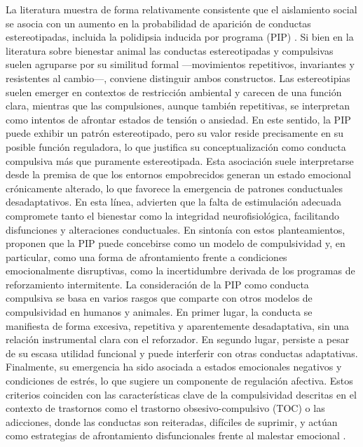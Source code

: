\documentclass[12pt,a4paper]{article}
\begin{document}
\begin{multicols}{2}
La literatura muestra de forma relativamente consistente que el aislamiento social se asocia con un aumento en la probabilidad de aparición de conductas estereotipadas, incluida la polidipsia inducida por programa (PIP) \citep{Jones1989,ibias2016effects,wang2024social,GROSS201261}. Si bien en la literatura sobre bienestar animal las conductas estereotipadas y compulsivas suelen agruparse por su similitud formal —movimientos repetitivos, invariantes y resistentes al cambio—, conviene distinguir ambos constructos. Las estereotipias suelen emerger en contextos de restricción ambiental y carecen de una función clara, mientras que las compulsiones, aunque también repetitivas, se interpretan como intentos de afrontar estados de tensión o ansiedad. En este sentido, la PIP puede exhibir un patrón estereotipado, pero su valor reside precisamente en su posible función reguladora, lo que justifica su conceptualización como conducta compulsiva más que puramente estereotipada. Esta asociación suele interpretarse desde la premisa de que los entornos empobrecidos generan un estado emocional crónicamente alterado, lo que favorece la emergencia de patrones conductuales desadaptativos. En esta línea, \citet{GarciaRebollar2024} advierten que la falta de estimulación adecuada compromete tanto el bienestar como la integridad neurofisiológica, facilitando disfunciones y alteraciones conductuales. En sintonía con estos planteamientos, \citet{Moreno2012} proponen que la PIP puede concebirse como un modelo de compulsividad y, en particular, como una forma de afrontamiento frente a condiciones emocionalmente disruptivas, como la incertidumbre derivada de los programas de reforzamiento intermitente. La consideración de la PIP como conducta compulsiva se basa en varios rasgos que comparte con otros modelos de compulsividad en humanos y animales. En primer lugar, la conducta se manifiesta de forma excesiva, repetitiva y aparentemente desadaptativa, sin una relación instrumental clara con el reforzador. En segundo lugar, persiste a pesar de su escasa utilidad funcional y puede interferir con otras conductas adaptativas. Finalmente, su emergencia ha sido asociada a estados emocionales negativos y condiciones de estrés, lo que sugiere un componente de regulación afectiva. Estos criterios coinciden con las características clave de la compulsividad descritas en el contexto de trastornos como el trastorno obsesivo-compulsivo (TOC) o las adicciones, donde las conductas son reiteradas, difíciles de suprimir, y actúan como estrategias de afrontamiento disfuncionales frente al malestar emocional \citep{Fineberg2010}.


\end{multicols}
\end{document}

